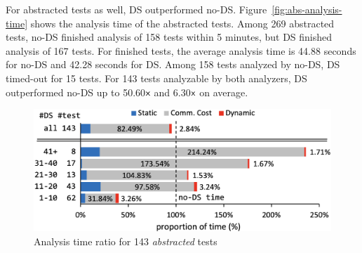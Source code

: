 For abstracted tests as well, DS outperformed no-DS.
Figure~\ref{fig:abs-analysis-time} shows the analysis time of the abstracted tests.
Among 269 abstracted tests, no-DS finished analysis of 158 tests within 5 minutes,
but DS finished analysis of 167 tests.  For finished tests, the average analysis
time is 44.88 seconds for no-DS and 42.28 seconds for DS. Among 158 tests analyzed by no-DS, DS
timed-out for 15 tests.  For 143 tests analyzable by both analyzers,
DS outperformed no-DS up to 50.60${\textsf{x}}$ and 6.30${\textsf{x}}$ on average.

\begin{figure}[t]
  \centering
  \includegraphics[width=\linewidth]{img/abs-analysis-ratio}
  \vspace*{-1.5em}
  \caption{Analysis time ratio for 143 \textit{abstracted} tests}
  \label{fig:abs-analysis-ratio}
  \vspace*{-1.5em}
\end{figure}

